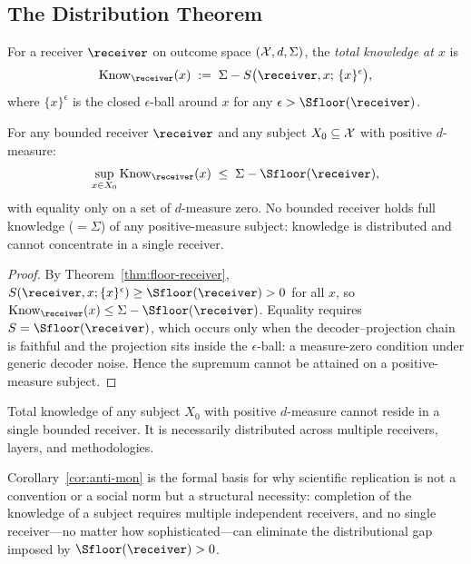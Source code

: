 \subsection{The Distribution Theorem}

\begin{definition}\label{def:total-know}
For a receiver $\receiver$ on outcome space $(\mathcal{X}, d, \Sigma)$, the \emph{total knowledge at $x$} is
\[
\Know_\receiver(x) \;:=\; \Sigma - S\bigl(\receiver, x;\, \{x\}^\epsilon\bigr),
\]
where $\{x\}^\epsilon$ is the closed $\epsilon$-ball around $x$ for any $\epsilon > \Sfloor(\receiver)$.
\end{definition}

\begin{theorem}\label{thm:distribution}
For any bounded receiver $\receiver$ and any subject $X_0 \subseteq \mathcal{X}$ with positive $d$-measure:
\[
\sup_{x \in X_0} \Know_\receiver(x) \;\leq\; \Sigma - \Sfloor(\receiver),
\]
with equality only on a set of $d$-measure zero. No bounded receiver holds full knowledge ($= \Sigma$) of any positive-measure subject: knowledge is distributed and cannot concentrate in a single receiver.
\end{theorem}

\begin{proof}
By Theorem~\ref{thm:floor-receiver}, $S(\receiver, x; \{x\}^\epsilon) \geq \Sfloor(\receiver) > 0$ for all $x$, so $\Know_\receiver(x) \leq \Sigma - \Sfloor(\receiver)$. Equality requires $S = \Sfloor(\receiver)$, which occurs only when the decoder--projection chain is faithful and the projection sits inside the $\epsilon$-ball: a measure-zero condition under generic decoder noise. Hence the supremum cannot be attained on a positive-measure subject.
\end{proof}

\begin{corollary}\label{cor:anti-mon}
Total knowledge of any subject $X_0$ with positive $d$-measure cannot reside in a single bounded receiver. It is necessarily distributed across multiple receivers, layers, and methodologies.
\end{corollary}

Corollary~\ref{cor:anti-mon} is the formal basis for why scientific replication is not a convention or a social norm but a structural necessity: completion of the knowledge of a subject requires multiple independent receivers, and no single receiver---no matter how sophisticated---can eliminate the distributional gap imposed by $\Sfloor(\receiver) > 0$.


